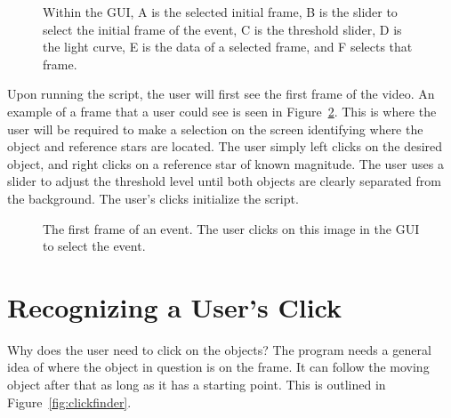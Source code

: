 \begin{figure}[htpb]
	\centering

	\caption{Within the GUI, A is the selected initial frame, B is the slider to select the initial frame of the event, C is the threshold slider, D is the light curve, E is the data of a selected frame, and F selects that frame.}
	\label{fig:gui}
\end{figure}

Upon running the script, the user will first see the first frame of the video. An example of a frame that a user could see is seen in Figure~\ref{fig:scene}. This is where the user will be required to make a selection on the screen identifying where the object and reference stars are located. The user simply left clicks on the desired object, and right clicks on a reference star of known magnitude. The user uses a slider to adjust the threshold level until both objects are clearly separated from the background. The user's clicks initialize the script. 

\begin{figure}[ht!]
	\centering
	\caption{The first frame of an event. The user clicks on this image in the GUI to select the event.}
	\label{fig:scene}
\end{figure}

\section{Recognizing a User's Click}

Why does the user need to click on the objects? The program needs a general idea of where the object in question is on the frame. It can follow the moving object after that as long as it has a starting point. This is outlined in Figure~\ref{fig:clickfinder}.

